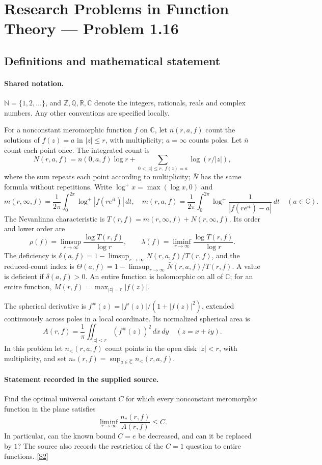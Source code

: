 \documentclass[11pt]{article}
\newcommand{\sref}[2]{\hyperlink{source:#1:#2}{[S#2]}}
\begin{document}
\section{Research Problems in Function Theory — Problem 1.16}\label{statement}

\subsection{Definitions and mathematical statement}

\paragraph{Shared notation.}$\mathbb N=\{1,2,\ldots\}$, and $\mathbb Z,\mathbb Q,\mathbb R,\mathbb C$ denote the integers, rationals, reals and complex numbers. Any other conventions are specified locally.


For a nonconstant meromorphic function $f$ on $\mathbb C$, let $n(r,a,f)$ count the solutions of $f(z)=a$ in $|z|\le r$, with multiplicity; $a=\infty$ counts poles. Let $\bar n$ count each point once. The integrated count is
\[
 N(r,a,f)=n(0,a,f)\log r+\sum_{0<|z|\le r,\ f(z)=a}\log(r/|z|),
\]
where the sum repeats each point according to multiplicity; $\bar N$ has the same formula without repetitions. Write $\log^+x=\max(\log x,0)$ and
\[
 m(r,\infty,f)=\frac1{2\pi}\int_0^{2\pi}\log^+|f(re^{it})|\,dt,\quad
 m(r,a,f)=\frac1{2\pi}\int_0^{2\pi}\log^+\frac1{|f(re^{it})-a|}\,dt\quad(a\in\mathbb C).
\]
The Nevanlinna characteristic is $T(r,f)=m(r,\infty,f)+N(r,\infty,f)$. Its order and lower order are
\[
 \rho(f)=\limsup_{r\to\infty}\frac{\log T(r,f)}{\log r},\qquad
 \lambda(f)=\liminf_{r\to\infty}\frac{\log T(r,f)}{\log r}.
\]
The deficiency is $\delta(a,f)=1-\limsup_{r\to\infty}N(r,a,f)/T(r,f)$, and the reduced-count index is $\Theta(a,f)=1-\limsup_{r\to\infty}\bar N(r,a,f)/T(r,f)$. A value is deficient if $\delta(a,f)>0$. An entire function is holomorphic on all of $\mathbb C$; for an entire function, $M(r,f)=\max_{|z|=r}|f(z)|$.

The spherical derivative is $f^\#(z)=|f'(z)|/(1+|f(z)|^2)$, extended continuously across poles in a local coordinate. Its normalized spherical area is
\[
 A(r,f)=\frac1\pi\iint_{|z|<r}(f^\#(z))^2\,dx\,dy\quad(z=x+iy).
\] In this problem let $n_{<}(r,a,f)$ count points in the open disk $|z|<r$, with multiplicity, and set $n_*(r,f)=\sup_{a\in\widehat{\mathbb C}}n_{<}(r,a,f)$.
\paragraph{Statement recorded in the supplied source.}
Find the optimal universal constant $C$ for which every nonconstant meromorphic function in the plane satisfies
\[
 \liminf_{r\to\infty}\frac{n_*(r,f)}{A(r,f)}\le C.
\]
In particular, can the known bound $C=e$ be decreased, and can it be replaced by $1$? The source also records the restriction of the $C=1$ question to entire functions. \sref{statement}{2}
\end{document}

